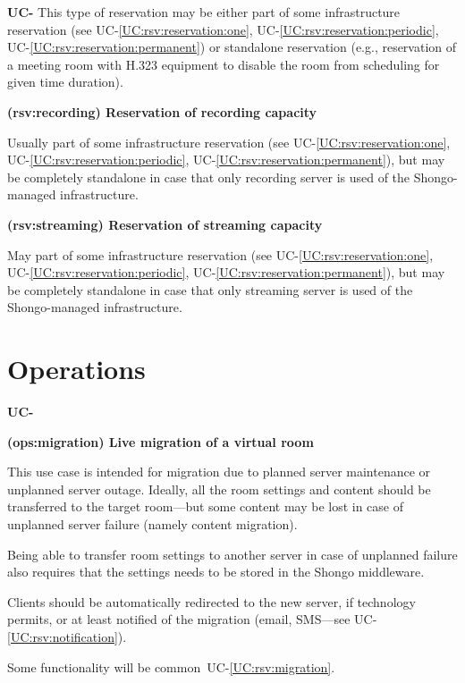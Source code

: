 \documentclass[a4paper]{report}
\makeatletter
\newcounter{UCcounter}
\newenvironment{UseCases}%
	{\begin{list}{\textbf{UC-\arabic{UCcounter}}}{\@nmbrlisttrue\def\@listctr{UCcounter}}}%
	{\end{list}}
\newcommand{\UClabel}[1]{\label{UC:#1}}
\newcommand{\UCref}[1]{UC-\ref{UC:#1}}
\newcommand{\UseCase}[2]{\item\UClabel{#2} \textbf{(#2) #1}\\ \nopagebreak}
\makeatother
\begin{document}
\begin{UseCases}
This type of reservation may be either part of some infrastructure reservation
(see \UCref{rsv:reservation:one}, \UCref{rsv:reservation:periodic},
\UCref{rsv:reservation:permanent}) or standalone reservation (e.g., reservation
of a meeting room with H.323 equipment to disable the room from scheduling for
given time duration).


\UseCase{Reservation of recording capacity}{rsv:recording}

Usually part of some infrastructure reservation (see
\UCref{rsv:reservation:one}, \UCref{rsv:reservation:periodic},
\UCref{rsv:reservation:permanent}), but may be completely standalone in case
that only recording server is used of the Shongo-managed infrastructure.


\UseCase{Reservation of streaming capacity}{rsv:streaming}

May part of some infrastructure reservation (see \UCref{rsv:reservation:one},
\UCref{rsv:reservation:periodic}, \UCref{rsv:reservation:permanent}), but may
be completely standalone in case that only streaming server is used of the
Shongo-managed infrastructure.

\end{UseCases}


\section{Operations}

\begin{UseCases}

\UseCase{Live migration of a virtual room}{ops:migration}

This use case is intended for migration due to planned server maintenance or
unplanned server outage.  Ideally, all the room settings and content should be
transferred to the target room---but some content may be lost in case of
unplanned server failure (namely content migration).

Being able to transfer room settings to another server in case of unplanned
failure also requires that the settings needs to be stored in the Shongo
middleware.

Clients should be automatically redirected to the new server, if technology
permits, or at least notified of the migration (email, SMS---see
\UCref{rsv:notification}).

Some functionality will be common~\UCref{rsv:migration}.

\end{UseCases}
\end{document}
